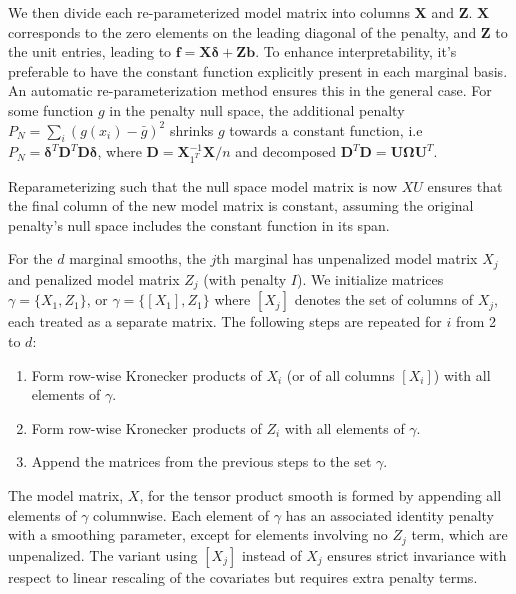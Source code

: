 \documentclass[12pt, twoside,hidelinks]{article}
\theoremstyle{definition}
\numberwithin{equation}{section}
\begin{document}
We then divide each re-parameterized model matrix into columns \( \mathbf{X} \) and \( \mathbf{Z} \). \( \mathbf{X} \) corresponds to the zero elements on the leading diagonal of the penalty, and \( \mathbf{Z} \) to the unit entries, leading to \( \boldsymbol{f} = \mathbf{X} \boldsymbol{\delta} + \mathbf{Z}\boldsymbol{b} \). To enhance interpretability, it's preferable to have the constant function explicitly present in each marginal basis. An automatic re-parameterization method ensures this in the general case. For some function \( g \) in the penalty null space, the additional penalty \( P_N = \sum_i (g(x_i) - \bar{g})^2 \) shrinks \( g \) towards a constant function, i.e \( P_N = \boldsymbol{\delta}^T \mathbf{D}^T \mathbf{D} \boldsymbol{\delta} \), where \( \mathbf{D} = \mathbf{X}^{-1}_{1^T} \mathbf{X}/n \) and decomposed \( \mathbf{D}^T \mathbf{D} = \mathbf{U} \mathbf{\Omega} \mathbf{U}^T \).
\newline

Reparameterizing such that the null space model matrix is now \( XU \) ensures that the final column of the new model matrix is constant, assuming the original penalty's null space includes the constant function in its span.

For the \( d \) marginal smooths, the \( j \)th marginal has unpenalized model matrix \( X_j \) and penalized model matrix \( Z_j \) (with penalty \( I \)). We initialize matrices \( \gamma = \{X_1, Z_1\} \), or \( \gamma = \{[X_1], Z_1\} \) where \( [X_j] \) denotes the set of columns of \( X_j \), each treated as a separate matrix. The following steps are repeated for \( i \) from 2 to \( d \):

\begin{enumerate}
    \item Form row-wise Kronecker products of \( X_i \) (or of all columns \( [X_i] \)) with all elements of \( \gamma \).
    \item Form row-wise Kronecker products of \( Z_i \) with all elements of \( \gamma \).
    \item Append the matrices from the previous steps to the set \( \gamma \).
\end{enumerate}

The model matrix, \( X \), for the tensor product smooth is formed by appending all elements of \( \gamma \) columnwise. Each element of \( \gamma \) has an associated identity penalty with a smoothing parameter, except for elements involving no \( Z_j \) term, which are unpenalized. The variant using \( [X_j] \) instead of \( X_j \) ensures strict invariance with respect to linear rescaling of the covariates but requires extra penalty terms.
\end{document}
